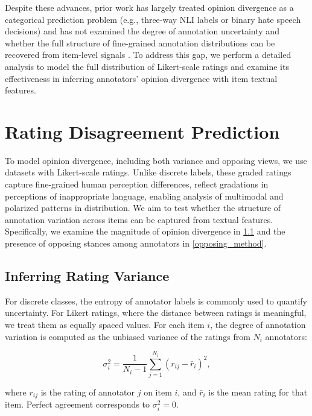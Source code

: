 \documentclass{article} %
\begin{document}
\vspace{0.15cm}

Despite these advances, prior work has largely treated opinion divergence as a categorical prediction problem (e.g., three-way NLI labels or binary hate speech decisions) and has not examined the degree of annotation uncertainty and whether the full structure of fine-grained annotation distributions can be recovered from item-level signals \citep{zhang-2025-proposal}. To address this gap, we perform a detailed analysis to model the full distribution of Likert-scale ratings and examine its effectiveness in inferring annotators' opinion divergence with item textual features.




\section{Rating Disagreement Prediction}

To model opinion divergence, including both variance and opposing views, we use datasets with Likert-scale ratings. Unlike discrete labels, these graded ratings capture fine-grained human perception differences, reflect gradations in perceptions of inappropriate language, enabling analysis of multimodal and polarized patterns in distribution.
We aim to test whether the structure of annotation variation across items can be captured from textual features. Specifically, we examine the magnitude of opinion divergence in \cref{variaiton_method} and the presence of opposing stances among annotators in \cref{opposing_method}.


\subsection{Inferring Rating Variance} \label{variaiton_method}

For discrete classes, the entropy of annotator labels is commonly used to quantify uncertainty. For Likert ratings, where the distance between ratings is meaningful, we treat them as equally spaced values. For each item \(i\), the degree of annotation variation is computed as the unbiased variance of the ratings from \(N_i\) annotators:

\begin{equation}
\sigma_i^2 = \frac{1}{N_i - 1} 
\sum_{j=1}^{N_i} (r_{ij} - \bar{r}_i)^2,
\end{equation}


\noindent where \(r_{ij}\) is the rating of annotator \(j\) on item \(i\), and \(\bar{r}_i\) is the mean rating for that item. Perfect agreement corresponds to \(\sigma_i^2 = 0\).
\end{document}
